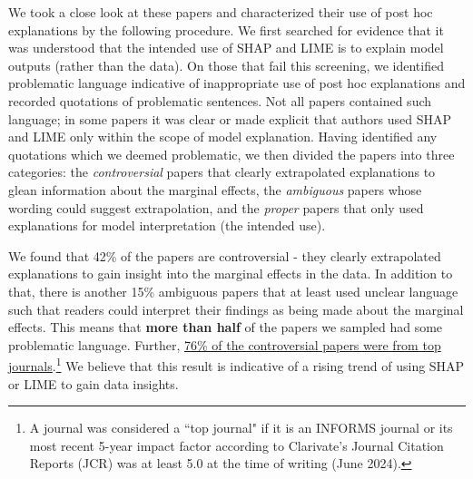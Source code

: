 \documentclass[12pt]{article}  %
\begin{document}
        
        We took a close look at these papers and characterized their use of post hoc explanations by the following procedure. We first searched for evidence that it was understood that the intended use of SHAP and LIME is to explain model outputs (rather than the data). On those that fail this screening, we identified problematic language indicative of inappropriate use of post hoc explanations and recorded quotations of problematic sentences.
        Not all papers contained such language; in some papers it was clear or made explicit that authors used SHAP and LIME only within the scope of model explanation. Having identified any quotations which we deemed problematic, we then divided the papers into three categories: the \textit{controversial} papers that clearly extrapolated explanations to glean information about the marginal effects, the \textit{ambiguous} papers whose wording could suggest extrapolation, and the \textit{proper} papers that only used explanations for model interpretation (the intended use).%

        We found that 42\% of the papers are controversial - they clearly extrapolated explanations to gain insight into the marginal effects in the data. In addition to that, there is another 15\% ambiguous papers that at least used unclear language such that readers could interpret their findings as being made about the marginal effects. This means that \textbf{more than half} of the papers we sampled had some problematic language. Further, \underline{76\% of the controversial papers were from top journals}.\footnote{A journal was considered a ``top journal" if it is an INFORMS journal or its most recent 5-year impact factor according to Clarivate's Journal Citation Reports (JCR) was at least 5.0 at the time of writing (June 2024).}
        We believe that this result is indicative of a rising trend of using SHAP or LIME to gain data insights.
\end{document}
